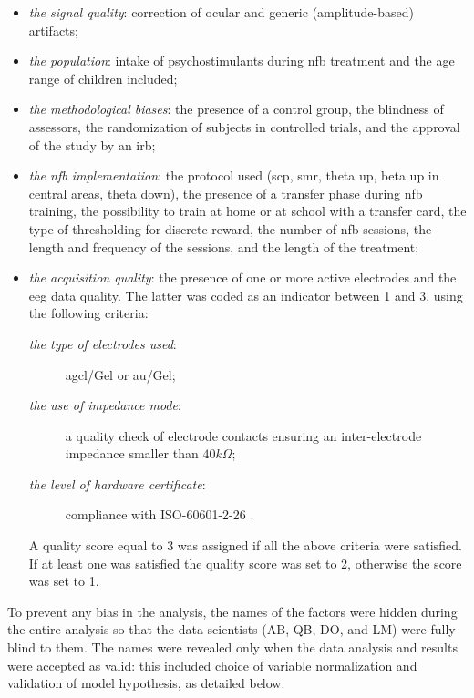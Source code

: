 \begin{itemize}
  \item \emph{the signal quality}: correction of ocular and generic (amplitude-based) artifacts;
  \item \emph{the population}: intake of psychostimulants during \gls{nfb} treatment and the age range of children
  included;
  \item \emph{the methodological biases}: the presence of a control group, the blindness of assessors, 
  the randomization of subjects in controlled trials, and the approval of the study by an \gls{irb};
  \item \emph{the \gls{nfb} implementation}: the protocol used (\gls{scp}, \gls{smr}, 
  theta up, beta up in central areas, theta down), the presence of a transfer phase during \gls{nfb} training, the 
	possibility to train at home or at school with a transfer card, 
  the type of thresholding for discrete reward, the number of \gls{nfb} sessions, the length and frequency of the sessions, and the length of
  the treatment;
  \item \emph{the acquisition quality}: the presence of one or more active electrodes and the \gls{eeg} data quality. 
  The latter was coded as an indicator between 1 and 3, using the following criteria:   
	\begin{description}
	  \item[\emph{the type of electrodes used}:] \gls{agcl}/Gel or \gls{au}/Gel;
    \item[\emph{the use of impedance mode}:] a quality check of electrode contacts
		ensuring an inter-electrode impedance smaller than $40k\Omega$;  
    \item[\emph{the level of hardware certificate}:] compliance with ISO-60601-2-26 \citep{ISO-60601-2-26:2012}.
	\end{description}
	A quality score equal to 3 was assigned if all the above criteria were satisfied. If at least one was satisfied
	the quality score was set to 2, otherwise the score was set to 1.
\end{itemize}	

To prevent any bias in the analysis, the names of the factors were hidden during the entire analysis so that the data scientists (AB, QB,
DO, and LM) were fully blind to them. The names were revealed only when the data analysis and results were accepted as valid: 
this included choice of variable normalization and validation of model hypothesis, as detailed below.


